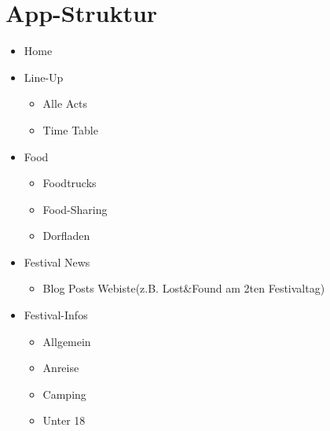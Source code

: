 \documentclass[a4paper,12pt,
headsepline,           %
oneside,               %
pointlessnumbers,      %
bibtotoc,              %
BCOR15mm               %
]{scrbook}
\begin{document}
\section*{App-Struktur}
\begin{itemize}
  \item Home
  \item Line-Up
  \begin{itemize}
    \item Alle Acts
    \item Time Table
  \end{itemize}
  \item Food
  \begin{itemize}
    \item Foodtrucks
    \item Food-Sharing
    \item Dorfladen
  \end{itemize}
  \item Festival News
  \begin{itemize}
    \item Blog Posts Webiste(z.B. Lost\&Found am 2ten Festivaltag)
  \end{itemize}
  \item Festival-Infos
  \begin{itemize}
    \item Allgemein
    \item Anreise
    \item Camping
    \item Unter 18
  \end{itemize}
\end{itemize}
\end{document}
